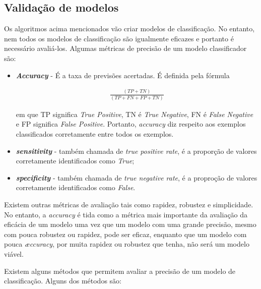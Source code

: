 \subsection{Validação de modelos}

Os algoritmos acima mencionados vão criar modelos de classificação. No entanto, nem todos os modelos de classificação são igualmente eficazes e portanto é necessário avaliá-los. Algumas métricas de precisão de um modelo classificador são:

\begin{itemize}
\item{\textbf{\textit{Accuracy}}} - É a taxa de previsões acertadas. É definida pela fórmula 

\begin{align*}
\frac{(TP + TN)}{(TP + FN + FP + TN)}
\end{align*}

em que TP significa \textit{True Positive}, TN é \textit{True Negative}, FN é \textit{False Negative} e FP significa \textit{False Positive}. Portanto, \textit{accuracy} diz respeito aos exemplos classificados corretamente entre todos os exemplos. 
\item{\textbf{\textit{sensitivity}}} - também chamada de \textit{true positive rate}, é a proporção de valores corretamente identificados como \textit{True};
\item{\textbf{\textit{specificity}}} - também chamada de \textit{true negative rate}, é a proproção de valores corretamente identificados como \textit{False}.
\end{itemize}
Existem outras métricas de avaliação tais como rapidez, robustez e simplicidade. No entanto, a \textit{accuracy} é tida como a métrica mais importante da avaliação da eficácia de um modelo uma vez que um modelo com uma grande precisão, mesmo com pouca robustez ou rapidez, pode ser eficaz, enquanto que um modelo com pouca \textit{æccuracy}, por muita rapidez ou robustez que tenha, não será um modelo viável.

Existem alguns métodos que permitem avaliar a precisão de um modelo de classificação. Alguns dos métodos são:

